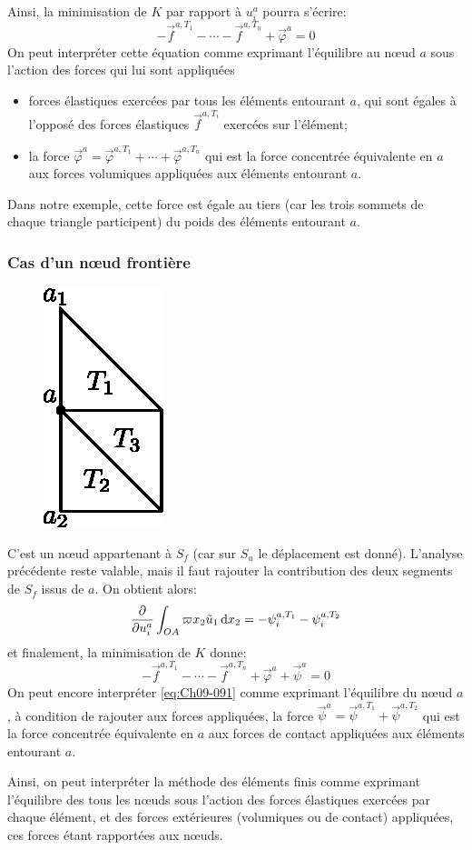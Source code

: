 Ainsi, la minimisation de $K$ par rapport à $u_i^a$ pourra s'écrire:
\begin{equation}
    -\vec{f}^{a,T_1} - \cdots - \vec{f}^{a,T_n} + \vec{\varphi}^a = 0
    \label{eq:Ch09-089}
\end{equation}
On peut interpréter cette équation comme exprimant l'équilibre au nœud $a$ sous l'action des forces qui lui sont appliquées
\begin{itemize}
    \item forces élastiques exercées par tous les éléments entourant $a$, qui sont égales à l'opposé des forces élastiques $\vec{f}^{a,T_i}$ exercées sur l'élément;
    \item la force $\vec{\varphi}^a = \vec{\varphi}^{a,T_1} + \cdots + \vec{\varphi}^{a,T_n}$ qui est la force concentrée équivalente en $a$ aux forces volumiques appliquées aux éléments entourant $a$.
\end{itemize}
Dans notre exemple, cette force est égale au tiers (car les trois sommets de chaque triangle participent) du poids des éléments entourant $a$. 
\subsubsection{Cas d'un nœud frontière}
\begin{figure}
    \begin{center}
        \includegraphics{../images/T1_Ch09-13}
    \end{center}
\end{figure}
C'est un nœud appartenant à $S_f$ (car sur $S_u$ le déplacement est donné).
L'analyse précédente reste valable, mais il faut rajouter la contribution des deux segments de $S_f$ issus de $a$.
On obtient alors: 
\begin{equation}
    \frac{\partial}{\partial u_i^a} \int_{OA} \varpi x_2 \tilde{u}_1 \mathop{\mathrm{{}d}}\mathopen{} x_2 = - \psi_i^{a,T_1} - \psi_i^{a,T_2}
    \label{eq:Ch09-090}
\end{equation}
et finalement, la minimisation de $K$ donne: 
\begin{equation}
    -\vec{f}^{a,T_1} - \cdots -\vec{f}^{a,T_n} + \vec{\varphi}^a + \vec{\psi}^a = 0 
    \label{eq:Ch09-091}
\end{equation}
On peut encore interpréter \eqref{eq:Ch09-091} comme exprimant l'équilibre du nœud $a$, à condition de rajouter aux forces appliquées, la force $\vec{\psi}^a = \vec{\psi}^{a,T_1}+ \vec{\psi}^{a,T_2}$ qui est la force concentrée équivalente en $a$ aux forces de contact appliquées aux éléments entourant $a$. 

Ainsi, on peut interpréter la méthode des éléments finis comme exprimant l'équilibre des tous les nœuds sous l'action des forces élastiques exercées par chaque élément, et des forces extérieures (volumiques ou de contact) appliquées, ces forces étant rapportées aux nœuds. 
